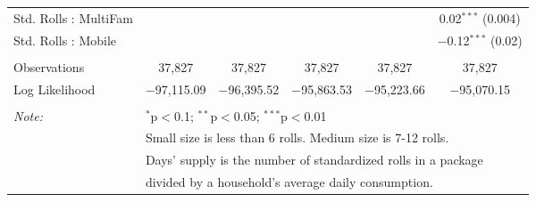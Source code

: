 \begin{table}[!htbp]
\begin{tabular}{@{\extracolsep{5pt}}lccccc}
  Std. Rolls : MultiFam &  &  &  &  & 0.02$^{***}$ (0.004) \\ 
  Std. Rolls : Mobile &  &  &  &  & $-$0.12$^{***}$ (0.02) \\ 
 \hline \\[-1.8ex] 
Observations & 37,827 & 37,827 & 37,827 & 37,827 & 37,827 \\ 
Log Likelihood & $-$97,115.09 & $-$96,395.52 & $-$95,863.53 & $-$95,223.66 & $-$95,070.15 \\ 
\hline 
\hline \\[-1.8ex] 
\textit{Note:}  & \multicolumn{5}{l}{$^{*}$p$<$0.1; $^{**}$p$<$0.05; $^{***}$p$<$0.01} \\ 
 & \multicolumn{5}{l}{Small size is less than 6 rolls. Medium size is 7-12 rolls. } \\ 
 & \multicolumn{5}{l}{Days' supply is the number of standardized rolls in a package} \\ 
 & \multicolumn{5}{l}{divided by a household's average daily consumption.} \\ 
\end{tabular} 
\end{table} 
